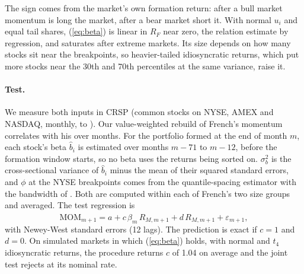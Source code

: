 \documentclass[11pt]{article}
\begin{document}
The sign comes from the market's own formation return: after a bull market momentum is long the market, after a bear market short it. With normal $u_i$ and equal tail shares, (\ref{eq:beta}) is linear in $R_F$ near zero, the relation \citet{grundy2001} estimate by regression, and saturates after extreme markets. Its size depends on how many stocks sit near the breakpoints, so heavier-tailed idiosyncratic returns, which put more stocks near the 30th and 70th percentiles at the same variance, raise it.

\paragraph{Test.} We measure both inputs in CRSP (common stocks on NYSE, AMEX and NASDAQ, monthly, to \CrspEnd{}). Our value-weighted rebuild of French's momentum correlates \RepCorr{} with his over \RepMonths{} months. For the portfolio formed at the end of month $m$, each stock's beta $\hat b_i$ is estimated over months $m-71$ to $m-12$, before the formation window starts, so no beta uses the returns being sorted on. $\sigma_b^2$ is the cross-sectional variance of $\hat b_i$ minus the mean of their squared standard errors, and $\phi$ at the NYSE breakpoints comes from the quantile-spacing estimator with the bandwidth of \citet{hallsheather1988}. Both are computed within each of French's two size groups and averaged. The test regression is
\begin{equation}
\mathrm{MOM}_{m+1}=a+c\,\hat\beta_{m}\,R_{M,m+1}+d\,R_{M,m+1}+\varepsilon_{m+1},
\end{equation}
with Newey-West standard errors (12 lags). The prediction is exact if $c=1$ and $d=0$. On simulated markets in which (\ref{eq:beta}) holds, with normal and $t_4$ idiosyncratic returns, the procedure returns $c$ of 1.04 on average and the joint test rejects at its nominal rate.

\begin{table}[ht]
\centering\small\setlength{\tabcolsep}{4pt}
\caption{Parameter-free test of Proposition~\ref{prop:beta}. $\Delta R^2$ is the increase in $R^2$ over a regression on $R_{M,m+1}$ alone; the share compares it with the increase from an in-sample regression that fits the slope on $R_F\,R_{M,m+1}$ \citep{grundy2001}. Equal-weighted is the theory's portfolio, French's momentum the traded factor.}
\label{tab:mech}
\end{table}
\end{document}
